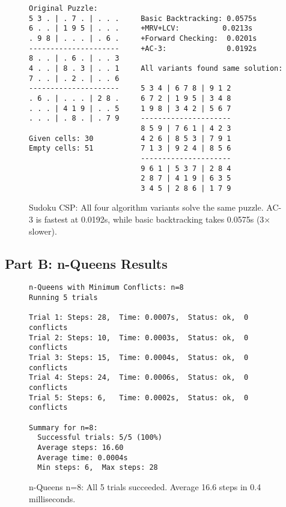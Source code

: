 \documentclass[letterpaper]{article}
\begin{document}
\begin{figure}[h]
\begin{small}
\begin{verbatim}
Original Puzzle:
5 3 . | . 7 . | . . .     Basic Backtracking: 0.0575s
6 . . | 1 9 5 | . . .     +MRV+LCV:          0.0213s
. 9 8 | . . . | . 6 .     +Forward Checking:  0.0201s
---------------------     +AC-3:              0.0192s
8 . . | . 6 . | . . 3
4 . . | 8 . 3 | . . 1     All variants found same solution:
7 . . | . 2 . | . . 6
---------------------     5 3 4 | 6 7 8 | 9 1 2
. 6 . | . . . | 2 8 .     6 7 2 | 1 9 5 | 3 4 8
. . . | 4 1 9 | . . 5     1 9 8 | 3 4 2 | 5 6 7
. . . | . 8 . | . 7 9     ---------------------
                          8 5 9 | 7 6 1 | 4 2 3
Given cells: 30           4 2 6 | 8 5 3 | 7 9 1
Empty cells: 51           7 1 3 | 9 2 4 | 8 5 6
                          ---------------------
                          9 6 1 | 5 3 7 | 2 8 4
                          2 8 7 | 4 1 9 | 6 3 5
                          3 4 5 | 2 8 6 | 1 7 9
\end{verbatim}
\end{small}
\caption{Sudoku CSP: All four algorithm variants solve the same puzzle. AC-3 is fastest at 0.0192s, while basic backtracking takes 0.0575s (3× slower).}
\label{fig:sudoku-csp}
\end{figure}

\subsection{Part B: n-Queens Results}

\begin{figure}[h]
\begin{small}
\begin{verbatim}
n-Queens with Minimum Conflicts: n=8
Running 5 trials

Trial 1: Steps: 28,  Time: 0.0007s,  Status: ok,  0 conflicts
Trial 2: Steps: 10,  Time: 0.0003s,  Status: ok,  0 conflicts
Trial 3: Steps: 15,  Time: 0.0004s,  Status: ok,  0 conflicts
Trial 4: Steps: 24,  Time: 0.0006s,  Status: ok,  0 conflicts
Trial 5: Steps: 6,   Time: 0.0002s,  Status: ok,  0 conflicts

Summary for n=8:
  Successful trials: 5/5 (100%)
  Average steps: 16.60
  Average time: 0.0004s
  Min steps: 6,  Max steps: 28
\end{verbatim}
\end{small}
\caption{n-Queens n=8: All 5 trials succeeded. Average 16.6 steps in 0.4 milliseconds.}
\label{fig:nqueens-8}
\end{figure}
\end{document}

